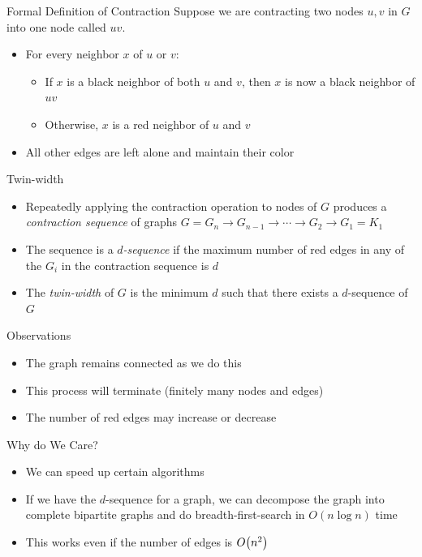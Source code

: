 \documentclass[aspectratio=169]{beamer}
\begin{document}
\begin{frame}{Formal Definition of Contraction}
    Suppose we are contracting two nodes $u, v$ in $G$ into one node called $uv$. 
    
    \begin{itemize}
        \item For every neighbor $x$ of $u$ or $v$: \pause
        \begin{itemize}
            \item If $x$ is a black neighbor of both $u$ and $v$, then $x$ is now a black neighbor of $uv$
            \item Otherwise, $x$ is a red neighbor of $u$ and $v$
        \end{itemize} \pause
        \item All other edges are left alone and maintain their color
    \end{itemize}
\end{frame}

\begin{frame}{Twin-width}
    \begin{itemize}
        \item Repeatedly applying the contraction operation to nodes of $G$ produces a \textcolor{sigma@mainblue}{\emph{contraction sequence}} of graphs $G = G_n \to G_{n - 1} \to \cdots \to G_2 \to G_1 = K_1$ \pause
        \item The sequence is a \textcolor{sigma@mainblue}{\emph{$d$-sequence}} if the maximum number of red edges in any of the $G_i$ in the contraction sequence is $d$ \pause
        \item The \textcolor{sigma@mainblue}{\emph{twin-width}} of $G$ is the minimum $d$ such that there exists a $d$-sequence of $G$
    \end{itemize}
\end{frame}

\begin{frame}{Observations}
    \begin{itemize}
        \item The graph remains connected as we do this \pause
        \item This process will terminate (finitely many nodes and edges) \pause
        \item The number of red edges may increase or decrease
    \end{itemize}
\end{frame}

\begin{frame}{Why do We Care?}
    \begin{itemize}
        \item We can speed up certain algorithms \pause
        \item If we have the $d$-sequence for a graph, we can decompose the graph into complete bipartite graphs and do breadth-first-search in $O(n \log n)$ time \cite{Twin-width-III}
        \item This works even if the number of edges is $O\pqty{n^2}$
    \end{itemize}
\end{frame}
\end{document}
